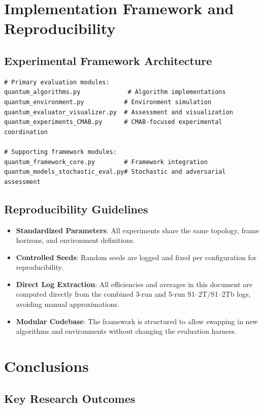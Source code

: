\documentclass[12pt,a4paper]{article}
\begin{document}
\section{Implementation Framework and Reproducibility}

\subsection{Experimental Framework Architecture}

\begin{lstlisting}[caption=Core Framework Components]
# Primary evaluation modules:
quantum_algorithms.py             # Algorithm implementations
quantum_environment.py           # Environment simulation
quantum_evaluator_visualizer.py  # Assessment and visualization
quantum_experiments_CMAB.py      # CMAB-focused experimental coordination

# Supporting framework modules:
quantum_framework_core.py        # Framework integration
quantum_models_stochastic_eval.py# Stochastic and adversarial assessment
\end{lstlisting}

\subsection{Reproducibility Guidelines}

\begin{itemize}
\item \textbf{Standardized Parameters}: All experiments share the same topology, frame horizons, and environment definitions.
\item \textbf{Controlled Seeds}: Random seeds are logged and fixed per configuration for reproducibility.
\item \textbf{Direct Log Extraction}: All efficiencies and averages in this document are computed directly from the combined 3-run and 5-run S1–2T/S1–2Tb logs, avoiding manual approximations.
\item \textbf{Modular Codebase}: The framework is structured to allow swapping in new algorithms and environments without changing the evaluation harness.
\end{itemize}

\newpage
\section{Conclusions}

\subsection{Key Research Outcomes}
\end{document}
